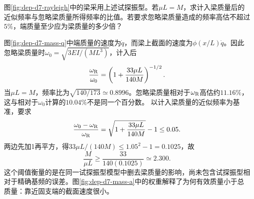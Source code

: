 \begin{example}[何时可以忽略梁自身质量]
图\ref{fig:dep-d7-rayleigh}中的梁采用上述试探振型。若$\mu L=M$，求计入梁质量后的近似频率与忽略梁质量所得频率的比值。若要求忽略梁质量造成的频率高估不超过$5\%$，端质量至少应为梁质量的多少倍？
\end{example}
\begin{solution}
图\ref{fig:dep-d7-mass-q}中端质量的速度为$\dot q$，而梁上截面的速度为$\phi(x/L)\dot q$。因此忽略梁质量时$\omega_0=\sqrt{3EI/(ML^3)}$，计入后
\[
 \frac{\omega_{\rm R}}{\omega_0}
 =\left(1+\frac{33\mu L}{140M}\right)^{-1/2}.
\]
当$\mu L=M$，频率比为$\sqrt{140/173}\simeq0.8996$。忽略梁质量相对于$\omega_{\rm R}$高估约$11.16\%$，这与相对于$\omega_0$计算的$10.04\%$不是同一个百分数。
以计入梁质量的近似频率为基准，要求
\[
 \frac{\omega_0-\omega_{\rm R}}{\omega_{\rm R}}
 =\sqrt{1+\frac{33\mu L}{140M}}-1\leq0.05.
\]
两边先加1再平方，得$33\mu L/(140M)\leq1.05^2-1=0.1025$，故
\[
 \boxed{\frac{M}{\mu L}\geq
 \frac{33}{140(0.1025)}\simeq2.300.}
\]
这个阈值衡量的是在同一试探振型模型中删去梁质量的影响，尚未包含试探振型相对于精确基频的误差。图\ref{fig:dep-d7-mass-a}中的权重解释了为何有效质量小于总质量：靠近固支端的截面速度很小。
\end{solution}
